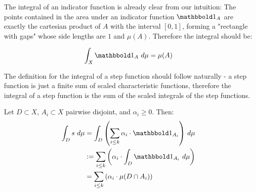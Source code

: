 The integral of an indicator function is already clear from our intuition: The points contained in the area under an indicator function $\boldone_A$ are exactly the cartesian product of $A$ with the interval $[0,1]$, forming a "rectangle with gaps" whose side lengths are $1$ and $\mu(A)$. Therefore the integral should be:
\begin{definition}
	\begin{align*}
		\int_X \boldone_A ~d\mu = \mu(A)
	\end{align*}
\end{definition}
The definition for the integral of a step function should follow naturally - a step function is just a finite sum of scaled characteristic functions, therefore the integral of a step function is the sum of the scaled integrals of the step functions.
\begin{definition}
	Let $D \subset X$, $A_i \subset X$ pairwise disjoint, and $\alpha_i \geq 0$. Then:
	\begin{align*}
		\int_D s ~d\mu 
		&= \int_D \lr(\sum_{i \leq k} \alpha_i \cdot \boldone_{A_i}) ~d\mu\\ 
		&:=\sum_{i \leq k} \lr(\alpha_i \cdot \int_D \boldone_{A_i} ~d\mu)\\ 
		&= \sum_{i \leq k} \lr(\alpha_i \cdot \mu(D \cap A_i))
	\end{align*}
\end{definition}
\begin{theorem}
\end{theorem}
\begin{theorem}
\end{theorem}
\clearpage
